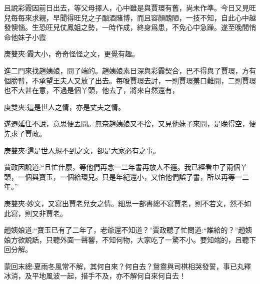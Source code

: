 \begin{parag}
    且說彩霞因前日出去，等父母擇人，心中雖是與賈環有舊，尚未作準。今日又見旺兒每每來求親，早聞得旺兒之子酗酒賭博，而且容顏醜陋，一技不知，自此心中越發懊惱。生恐旺兒仗鳳姐之勢，一時作成，終身爲患，不免心中急躁。遂至晚間悄命他妹子小霞\begin{note}庚雙夾:霞大小，奇奇怪怪之文，更覺有趣。\end{note}進二門來找趙姨娘，問了端的。趙姨娘素日深與彩霞契合，巴不得與了賈環，方有個膀臂，不承望王夫人又放了出去。每唆賈環去討，一則賈環羞口難開，二則賈環也不大甚在意，不過是個丫頭，他去了，將來自然還有，\begin{note}庚雙夾:這是世人之情，亦是丈夫之情。\end{note}遂遷延住不說，意思便丟開。無奈趙姨娘又不捨，又見他妹子來問，是晚得空，便先求了賈政。\begin{note}庚雙夾:這是世人想不到之文，卻是大家必有之事。\end{note}賈政因說道:“且忙什麼，等他們再念一二年書再放人不遲。我已經看中了兩個丫頭，一個與寶玉，一個給環兒。只是年紀還小，又怕他們誤了書，所以再等一二年。”\begin{note}庚雙夾:妙文，又寫出賈老兒女之情。細思一部書總不寫賈老，則不若文，然不如此寫，則又非賈老。\end{note}趙姨娘道:“寶玉已有了二年了，老爺還不知道？”賈政聽了忙問道:“誰給的？”趙姨娘方欲說話，只聽外面一聲響，不知何物，大家吃了一驚不小。要知端的，且聽下回分解。
\end{parag}


\begin{parag}
    \begin{note}蒙回末總:夏雨冬風常不解，其何自來？何自去？鴛鴦與司棋相哭發誓，事已丸釋冰消，及平地風波一起，措手不及，亦不解何自來何自去！\end{note}
\end{parag}
